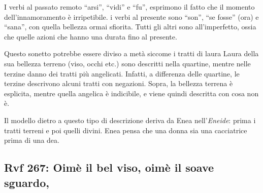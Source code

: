 \documentclass[a4paper]{article}
\newcommand{\quotes}[1]{``#1''}
\begin{document}
I verbi al passato remoto \quotes{arsi}, \quotes{vidi} e \quotes{fu},
esprimono il fatto che il momento dell'innamoramento è irripetibile.
i verbi al presente sono \quotes{son}, \quotes{se fosse} (ora) e \quotes{sana},
con quella bellezza ormai sfiorita.
Tutti gli altri sono all'imperfetto, ossia che quelle azioni che hanno una durata fino al presente.

Questo sonetto potrebbe essere diviso a metà siccome i tratti di laura Laura
della sua bellezza terreno (viso, occhi etc.) sono descritti nella quartine,
mentre nelle terzine danno dei tratti più angelicati.
Infatti, a differenza delle quartine, le terzine descrivono alcuni tratti con
negazioni. Sopra, la bellezza terrena è esplicita, mentre quella angelica è indicibile,
e viene quindi descritta con cosa non è.

Il modello dietro a questo tipo di descrizione deriva da Enea nell'\textit{Eneide}:
prima i tratti terreni e poi quelli divini. Enea pensa che una donna sia una cacciatrice
prima di una dea.



\pagebreak

\subsection{Rvf 267: Oimè il bel viso, oimè il soave sguardo,}
\end{document}
